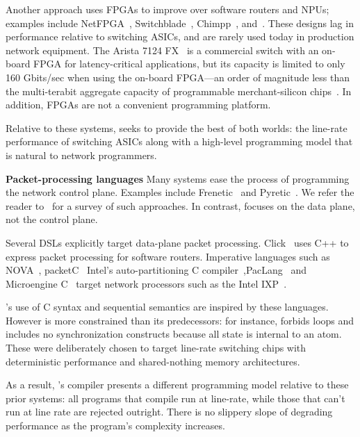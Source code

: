 Another approach uses FPGAs to improve over software routers and NPUs; examples
include NetFPGA~\cite{netfpga}, Switchblade~\cite{switchblade},
Chimpp~\cite{chimpp}, and~\cite{silver_bullet}. These designs lag in
performance relative to switching ASICs, and are rarely used today in
production network equipment. The Arista 7124 FX~\cite{7124fx} is a commercial
switch with an on-board FPGA for latency-critical applications, but its
capacity is limited to only 160 Gbits/sec when using the on-board FPGA---an
order of magnitude less than the multi-terabit aggregate capacity of
programmable merchant-silicon chips~\cite{xpliant}. In addition, FPGAs are not
a convenient programming platform.

Relative to these systems, \pktlanguage seeks to provide the best of both
worlds: the line-rate performance of switching ASICs along with a high-level
programming model that is natural to network programmers.

\textbf{Packet-processing languages}
Many systems ease the process of programming the network control plane.
Examples include Frenetic~\cite{frenetic} and Pyretic~\cite{pyretic}. We refer
the reader to~\cite{language_survey} for a survey of such approaches.
In contrast, \pktlanguage focuses on the data plane, not the control plane.

Several DSLs explicitly target data-plane packet processing. Click~\cite{click}
uses C++ to express packet processing for software routers. Imperative
languages such as NOVA~\cite{nova}, packetC~\cite{packetc} Intel's
auto-partitioning C compiler~\cite{intel_uiuc_pldi},PacLang~\cite{paclang_lang,
paclang_partitioner} and Microengine C~\cite{microenginec, intel_ixa} target
network processors such as the Intel IXP~\cite{ixp2800, ixp4xx}.

\pktlanguage's use of C syntax and sequential semantics are inspired by these
languages. However \pktlanguage is more constrained than its predecessors: for
instance, \pktlanguage forbids loops and includes no synchronization constructs
because all state is internal to an atom. These were deliberately chosen to
target line-rate switching chips with deterministic performance and
shared-nothing memory architectures.

As a result, \pktlanguage's compiler presents a different programming model
relative to these prior systems: all \pktlanguage programs that compile run at
line-rate, while those that can't run at line rate are rejected outright. There
is no slippery slope of degrading performance as the program's complexity
increases.

